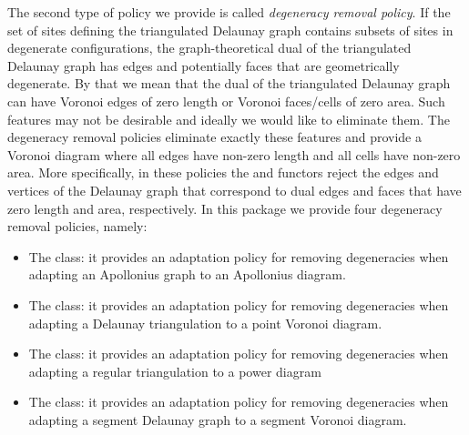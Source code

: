 The second type of policy we provide is called
\emph{degeneracy removal policy}. If the set of sites defining the
triangulated Delaunay graph contains subsets of sites in degenerate
configurations, the graph-theoretical dual of the triangulated
Delaunay graph has edges and potentially faces that are geometrically
degenerate. By that we mean that the dual of the triangulated Delaunay
graph can have Voronoi edges of zero length or Voronoi faces/cells of
zero area. Such features may not be desirable and ideally we would
like to eliminate them. The degeneracy removal policies eliminate
exactly these features and provide a Voronoi diagram where all edges
have non-zero length and all cells have non-zero area. More
specifically, in these policies the  and
 functors reject the edges and vertices of the
Delaunay graph that correspond to dual edges and faces that have zero
length and area, respectively. In this package we provide four
degeneracy removal policies, namely:
\begin{itemize}
\item
  The  class: it
  provides an adaptation policy for removing degeneracies when
  adapting an Apollonius graph to an Apollonius diagram.
\item
  The  class: it
  provides an adaptation policy for removing degeneracies when
  adapting a Delaunay triangulation to a point Voronoi diagram.
\item
  The  class: it
  provides an adaptation policy for removing degeneracies when
  adapting a regular triangulation to a power diagram 

\item
  The  class: it
  provides an adaptation policy for removing degeneracies when
  adapting a segment Delaunay graph to a segment Voronoi diagram.
\end{itemize}


